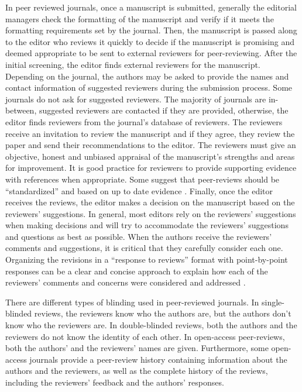 \documentclass[
]{book}
\begin{document}
In peer reviewed journals, once a manuscript is submitted, generally the editorial managers check the formatting of the manuscript and verify if it meets the formatting requirements set by the journal. Then, the manuscript is passed along to the editor who reviews it quickly to decide if the manuscript is promising and deemed appropriate to be sent to external reviewers for peer-reviewing. After the initial screening, the editor finds external reviewers for the manuscript. Depending on the journal, the authors may be asked to provide the names and contact information of suggested reviewers during the submission process. Some journals do not ask for suggested reviewers. The majority of journals are in-between, suggested reviewers are contacted if they are provided, otherwise, the editor finds reviewers from the journal's database of reviewers. The reviewers receive an invitation to review the manuscript and if they agree, they review the paper and send their recommendations to the editor. The reviewers must give an objective, honest and unbiased appraisal of the manuscript's strengths and areas for improvement. It is good practice for reviewers to provide supporting evidence with references when appropriate. Some suggest that peer-reviews should be ``standardized'' and based on up to date evidence \citep{moher2003peer}. Finally, once the editor receives the reviews, the editor makes a decision on the manuscript based on the reviewers' suggestions. In general, most editors rely on the reviewers' suggestions when making decisions and will try to accommodate the reviewers' suggestions and questions as best as possible. When the authors receive the reviewers' comments and suggestions, it is critical that they carefully consider each one. Organizing the revisions in a ``response to reviews'' format with point-by-point responses can be a clear and concise approach to explain how each of the reviewers' comments and concerns were considered and addressed \citep[p.222-230]{heard2016scientist}.

There are different types of blinding used in peer-reviewed journals. In single-blinded reviews, the reviewers know who the authors are, but the authors don't know who the reviewers are. In double-blinded reviews, both the authors and the reviewers do not know the identity of each other. In open-access peer-reviews, both the authors' and the reviewers' names are given. Furthermore, some open-access journals provide a peer-review history containing information about the authors and the reviewers, as well as the complete history of the reviews, including the reviewers' feedback and the authors' responses.
\end{document}
